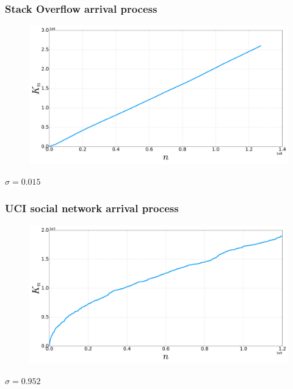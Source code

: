 \documentclass[final,hyperref={pdfpagelabels=false},noamsthm]{beamer}
\begin{document}
\begin{frame}
	\frametitle{Stack Overflow arrival process}
	\begin{figure}[h]
		\includegraphics[width=1.0\textwidth]{fig/n_stackoverflow_arrival.pdf}
	\end{figure}
	$\hat{\sigma}=0.015$
\end{frame}

\begin{frame}
	\frametitle{UCI social network arrival process}
	\begin{figure}[h]
		\includegraphics[width=1.0\textwidth]{fig/n_CollegeMsg_arrival.pdf}
	\end{figure}
	$\hat{\sigma} = 0.952$
\end{frame}
\end{document}
